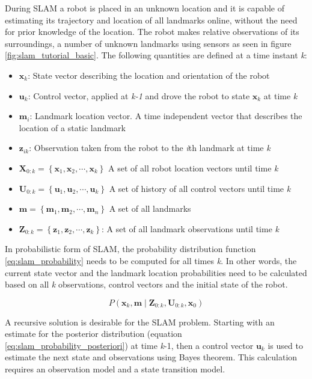 During SLAM a robot is placed in an unknown location and it is capable of estimating its trajectory and 
location of all landmarks online, without the need for prior knowledge of the location. The robot makes relative
observations of its surroundings, a number of unknown landmarks using sensors as seen in figure \ref{fig:slam_tutorial_basic}.
The following quantities are defined at a time instant \emph{k}:
\begin{itemize}
	\item $\mathbf{x}_{k}$: State vector describing the location and orientation of the robot
	\item $\mathbf{u}_{k}$: Control vector, applied at \emph{k-1} and drove the robot to state $\mathbf{x}_{k}$ at time \emph{k}
	\item $\mathbf{m}_i$: Landmark location vector. A time independent vector that describes the location of a static landmark
	\item $\mathbf{z}_{ik}$: Observation taken from the robot to the \emph{i}th landmark at time \emph{k}
	\item $\mathbf{X}_{0:k}=\left \{ \mathbf{x}_1,\mathbf{x}_2,\cdots,\mathbf{x}_k \right \}$ A set of all robot location vectors until time \emph{k}
	\item $\mathbf{U}_{0:k}=\left \{ \mathbf{u}_1,\mathbf{u}_2,\cdots,\mathbf{u}_k \right \}$ A set of history of all control vectors until time \emph{k}
	\item $\mathbf{m}=\left \{ \mathbf{m}_1,\mathbf{m}_2,\cdots,\mathbf{m}_n \right \}$ A set of all landmarks
	\item $\mathbf{Z}_{0:k}=\left \{ \mathbf{z}_1,\mathbf{z}_2,\cdots,\mathbf{z}_k \right \}$: A set of all landmark observations until time \emph{k}
\end{itemize}

In probabilistic form of SLAM, the probability distribution function \ref{eq:slam_probability} needs to be computed for
all times \emph{k}. In other words, the current state vector and the landmark location probabilities need to be calculated
based on all \emph{k} observations, control vectors and the initial state of the robot.

\begin{equation} \label{eq:slam_probability}
    P\left ( \mathbf{x}_{k},\mathbf{m}\mid \mathbf{Z}_{0:k},\mathbf{U}_{0:k},\mathbf{x}_{0}\right )
\end{equation}

A recursive solution is desirable for the SLAM problem. Starting with an estimate for the posterior distribution 
(equation \ref{eq:slam_probability_posteriori}) at time \emph{k}-1, then a control vector $\mathbf{u}_{k}$ is used to
estimate the next state and observations using Bayes theorem. This calculation requires an observation model and a 
state transition model.
 



